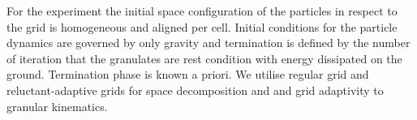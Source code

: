 \documentclass[times,12pt]{article}
\begin{document}
For the experiment the initial space configuration of the particles in respect to the grid is homogeneous and aligned per cell. Initial conditions for the particle dynamics are governed by only gravity and termination is defined by the number of iteration that the granulates are rest condition with energy dissipated on the ground. Termination phase is known a priori. We utilise regular grid and reluctant-adaptive grids for space decomposition and and grid adaptivity to granular kinematics. 

\end{document}
